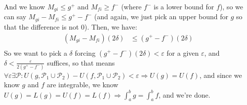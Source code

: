 \documentclass{article}
\newcommand{\parti}{\mathcal{P}}
\begin{document}
And we know $M_{gi} \leq g^{+}$ and $M_{fi} \geq f^{-}$ (where $f^{-}$ is a lower bound for $f$), so we can say $M_{gi} - M_{fi} \leq g^{+} - f^{-}$ (and again, we just pick an upper bound for $g$ so that the difference is not $0$). Then, we have:
\begin{align*}
(M_{gi} - M_{fi})(2\delta) &\leq (g^{+} - f^{-})(2\delta)\\
\end{align*}
So we want to pick a $\delta$ forcing $(g^{+} - f^{-})(2\delta) < \varepsilon$ for a given $\varepsilon$, and $\delta < \frac{\varepsilon}{2(g^{+} - f^{-})}$ suffices, so that means $\forall \varepsilon \exists \parti: U(g, \parti_{1} \cup \parti_{2}) - U(f, \parti_{1} \cup \parti_{2}) < \varepsilon \Rightarrow U(g) = U(f)$, and since we know $g$ and $f$ are integrable, we know $U(g) = L(g) = U(f) = L(f) \Rightarrow \int_{a}^{b} g = \int_{a}^{b}f$, and we're done.
\end{document}
